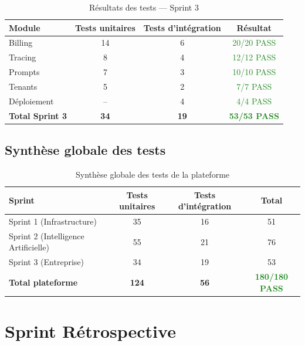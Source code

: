\begin{table}[H]
\centering
\caption{Résultats des tests --- Sprint 3}
\label{tab:tests_s3}
\begin{tabular}{|l|c|c|c|}
\hline
\textbf{Module} & \textbf{Tests unitaires} & \textbf{Tests d'intégration} & \textbf{Résultat} \\
\hline
Billing & 14 & 6 & \textcolor{ForestGreen}{20/20 PASS} \\
\hline
Tracing & 8 & 4 & \textcolor{ForestGreen}{12/12 PASS} \\
\hline
Prompts & 7 & 3 & \textcolor{ForestGreen}{10/10 PASS} \\
\hline
Tenants & 5 & 2 & \textcolor{ForestGreen}{7/7 PASS} \\
\hline
Déploiement & -- & 4 & \textcolor{ForestGreen}{4/4 PASS} \\
\hline
\textbf{Total Sprint 3} & \textbf{34} & \textbf{19} & \textcolor{ForestGreen}{\textbf{53/53 PASS}} \\
\hline
\end{tabular}
\end{table}

\subsection{Synthèse globale des tests}

\begin{table}[H]
\centering
\caption{Synthèse globale des tests de la plateforme}
\label{tab:tests_global}
\begin{tabular}{|l|c|c|c|}
\hline
\textbf{Sprint} & \textbf{Tests unitaires} & \textbf{Tests d'intégration} & \textbf{Total} \\
\hline
Sprint 1 (Infrastructure) & 35 & 16 & 51 \\
\hline
Sprint 2 (Intelligence Artificielle) & 55 & 21 & 76 \\
\hline
Sprint 3 (Entreprise) & 34 & 19 & 53 \\
\hline
\textbf{Total plateforme} & \textbf{124} & \textbf{56} & \textcolor{ForestGreen}{\textbf{180/180 PASS}} \\
\hline
\end{tabular}
\end{table}


\section{Sprint Rétrospective}
\label{sec:s3_retro}

